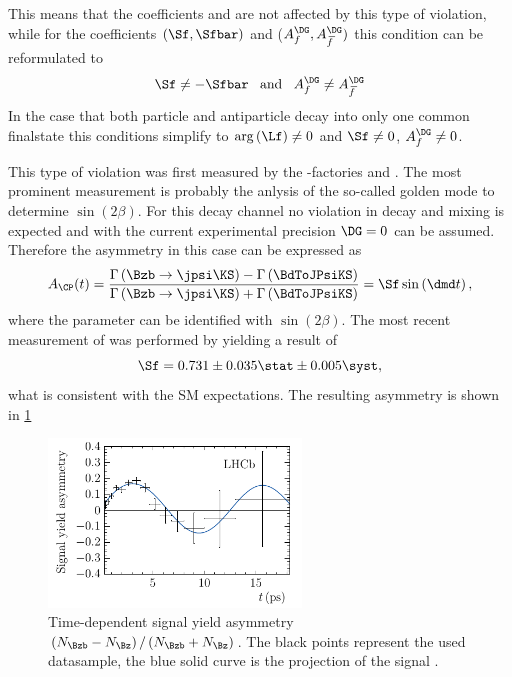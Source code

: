 This means that the \CP coefficients \Cf and \Cfbar are not affected by this type of \CP violation, while for the coefficients $(\Sf, \Sfbar)$ and  ($A_f^{\DG}, A_{\kern 1.5pt\overline{\kern -1.5pt f\kern 1.5pt}}^{\DG})$ this condition can be reformulated to
\begin{equation}
\Sf\neq-\Sfbar\,\,\,\,\,\text{and}\,\,\,\,\,A_f^{\DG}\neq A_{\kern 1.5pt\overline{\kern -1.5pt f\kern 1.5pt}}^{\DG}
\end{equation}
In the case that both particle and antiparticle decay into only one common finalstate this conditions simplify to $\arg\left(\Lf\right)\neq0$ and $\Sf\neq0$, $A_f^{\DG}\neq0$.

This type of \CP violation was first measured by the \B-factories \babar \cite{Aubert:2001nu} and \belle \cite{Abe:2001xe}.
The most prominent measurement is probably the anlysis of the so-called golden mode \BdToJPsiKS to determine $\sin{}\left(2\beta\right)$.
For this decay channel no \CP violation in decay and mixing is expected and with the current experimental precision $\DG=0$ can be assumed.
Therefore the \CP asymmetry in this case can be expressed as
\begin{equation}
A_{\CP}(t)=\frac{\Gamma\left(\Bzb\to\jpsi\KS\right)-\Gamma\left(\BdToJPsiKS\right)}{\Gamma\left(\Bzb\to\jpsi\KS\right)+\Gamma\left(\BdToJPsiKS\right)}=\Sf\sin\left(\dmd t\right),
\end{equation}
where the parameter \Sf can be identified with $\sin{}\left(2\beta\right)$.
The most recent measurement of \Sf was performed by \lhcb \cite{Aaij:2015vza} yielding a result of
\begin{equation}
\Sf=0.731\pm0.035\stat\pm0.005\syst,
\end{equation}
what is consistent with the \ac{SM} expectations. The resulting \CP asymmetry is shown in \cref{fig:sin2beta}
\begin{figure}[tbp]
	\centering
	\includegraphics[width=0.6\textwidth]{03CPV/figs/InterferenceCPV.pdf}
	\caption{Time-dependent signal yield asymmetry $\left(N_{\Bzb}-N_{\Bz}\right)/\left(N_{\Bzb}+N_{\Bz}\right)$. The black points represent the used datasample, the blue solid curve is the projection of the signal \PDF.}
	\label{fig:sin2beta}
\end{figure}

